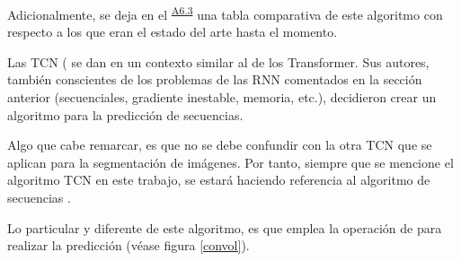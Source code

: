 Adicionalmente, se deja en el \textsuperscript{\hyperref[ap:inf_res]{A6.3}} una tabla comparativa de este algoritmo con respecto a los que eran el estado del arte hasta el momento.



Las TCN ( \parencite{TCNSeq} se dan en un contexto similar al de los Transformer. Sus autores, también conscientes de los problemas de las RNN comentados  en la sección anterior (secuenciales,  gradiente inestable, memoria, etc.), decidieron crear un algoritmo para la predicción de secuencias\fnm. 

Algo que cabe remarcar, es que no se debe confundir con la otra TCN \parencite{TCNOrig} que se aplican para la segmentación de imágenes. Por tanto, siempre que se mencione el algoritmo TCN en este trabajo, se estará haciendo referencia al algoritmo de secuencias \parencite{TCNSeq}.

Lo particular y diferente de este algoritmo, es que emplea la operación de  para realizar la predicción (véase figura \ref{convol}).

